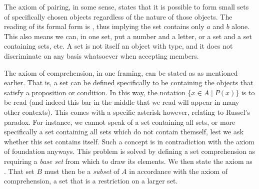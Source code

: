 \documentclass[11pt]{article}
\begin{document}
The axiom of pairing, in some sense, states that it is possible to form small sets of specifically chosen objects regardless of the nature of those objects. The reading of its formal form is , thus implying the set contains only $a$ and $b$ alone. This also means we can, in one set, put a number and a letter, or a set and a set containing sets, etc. A set is not itself an object with type, and it does not discriminate on any basis whatsoever when accepting members.

The axiom of comprehension, in one framing, can be stated as  as mentioned earlier. That is, a set can be defined specifically to be containing the objects that satisfy a proposition or condition. In this way, the notation $\{x \in A \mid P(x) \}$ is to be read  (and indeed this bar in the middle that we read  will appear in many other contexts). This comes with a specific asterisk however, relating to Russel's paradox. For instance, we cannot speak of a set containing all sets, or more specifically a set containing all sets which do not contain themself, lest we ask whether this set contains itself. Such a concept is in contradiction with the axiom of foundation anyways. This problem is solved by defining a set comprehension as requiring a \emph{base set} from which to draw its elements. We then state the axiom as . That set $B$ must then be a \emph{subset} of $A$ in accordance with the axiom of comprehension, a set that is a restriction on a larger set.
\end{document}
